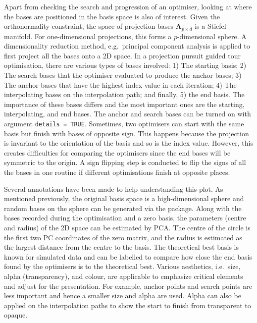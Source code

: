 Apart from checking the search and progression of an optimiser, looking
at where the bases are positioned in the basis space is also of
interest. Given the orthonormality constraint, the space of projection
bases \(\mathbf{A}_{p \times d}\) is a Stiefel manifold. For
one-dimensional projections, this forms a \(p\)-dimensional sphere. A
dimensionality reduction method, e.g.~principal component analysis is
applied to first project all the bases onto a 2D space. In a projection
pursuit guided tour optimisation, there are various types of bases
involved: 1) The starting basis; 2) The search bases that the optimiser
evaluated to produce the anchor bases; 3) The anchor bases that have the
highest index value in each iteration; 4) The interpolating bases on the
interpolation path; and finally, 5) the end basis. The importance of
these bases differs and the most important ones are the starting,
interpolating, and end bases. The anchor and search bases can be turned
on with argument \texttt{details\ =\ TRUE}. Sometimes, two optimisers
can start with the same basis but finish with bases of opposite sign.
This happens because the projection is invariant to the orientation of
the basis and so is the index value. However, this creates difficulties
for comparing the optimisers since the end bases will be symmetric to
the origin. A sign flipping step is conducted to flip the signs of all
the bases in one routine if different optimisations finish at opposite
places.

Several annotations have been made to help understanding this plot. As
mentioned previously, the original basis space is a high-dimensional
sphere and random bases on the sphere can be generated via the
 \citep{geozoo} package. Along with the bases recorded
during the optimisation and a zero basis, the parameters (centre and
radius) of the 2D space can be estimated by PCA. The centre of the
circle is the first two PC coordinates of the zero matrix, and the
radius is estimated as the largest distance from the centre to the
basis. The theoretical best basis is known for simulated data and can be
labelled to compare how close the end basis found by the optimisers is
to the theoretical best. Various aesthetics, i.e.~size, alpha
(transparency), and colour, are applicable to emphasize critical
elements and adjust for the presentation. For example, anchor points and
search points are less important and hence a smaller size and alpha are
used. Alpha can also be applied on the interpolation paths to show the
start to finish from transparent to opaque.

